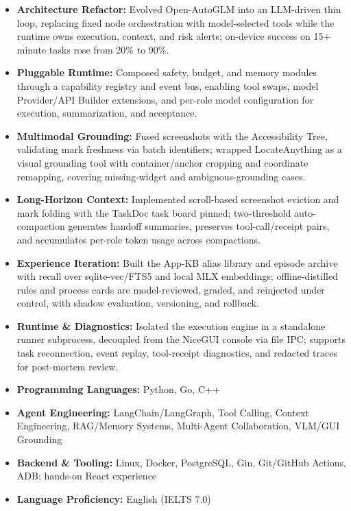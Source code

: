 \begin{itemize}
  \item \textbf{Architecture Refactor:} Evolved Open-AutoGLM into an LLM-driven thin loop, replacing fixed node orchestration with model-selected tools while the runtime owns execution, context, and risk alerts; on-device success on 15+ minute tasks rose from 20\% to 90\%.
  \item \textbf{Pluggable Runtime:} Composed safety, budget, and memory modules through a capability registry and event bus, enabling tool swaps, model Provider/API Builder extensions, and per-role model configuration for execution, summarization, and acceptance.
  \item \textbf{Multimodal Grounding:} Fused screenshots with the Accessibility Tree, validating mark freshness via batch identifiers; wrapped \mbox{LocateAnything} as a visual grounding tool with container/anchor cropping and coordinate remapping, covering missing-widget and ambiguous-grounding cases.
  \item \textbf{Long-Horizon Context:} Implemented scroll-based screenshot eviction and mark folding with the TaskDoc task board pinned; two-threshold auto-compaction generates handoff summaries, preserves tool-call/receipt pairs, and accumulates per-role token usage across compactions.
  \item \textbf{Experience Iteration:} Built the App-KB alias library and episode archive with recall over sqlite-vec/FTS5 and local MLX embeddings; offline-distilled rules and process cards are model-reviewed, graded, and reinjected under control, with shadow evaluation, versioning, and rollback.
  \item \textbf{Runtime \& Diagnostics:} Isolated the execution engine in a standalone runner subprocess, decoupled from the NiceGUI console via file IPC; supports task reconnection, event replay, tool-receipt diagnostics, and redacted traces for post-mortem review.
\end{itemize}

\begin{itemize}[parsep=0.5ex]
  \item \textbf{Programming Languages:} Python, Go, C++
  \item \textbf{Agent Engineering:} LangChain/LangGraph, Tool Calling, Context Engineering, RAG/Memory Systems, Multi-Agent Collaboration, VLM/GUI Grounding
  \item \textbf{Backend \& Tooling:} Linux, Docker, PostgreSQL, Gin, Git/GitHub Actions, ADB; hands-on React experience
  \item \textbf{Language Proficiency:} English (IELTS 7.0)
\end{itemize}
